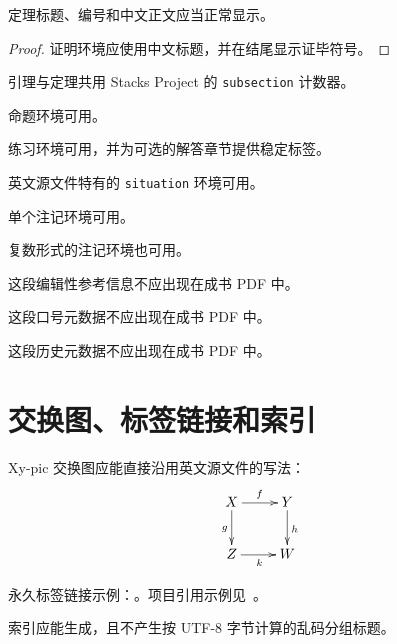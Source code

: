\begin{theorem}[示例定理]
\label{template-theorem-example}
定理标题、编号和中文正文应当正常显示。
\end{theorem}

\begin{proof}
证明环境应使用中文标题，并在结尾显示证毕符号。
\end{proof}

\begin{lemma}
\label{template-lemma-example}
引理与定理共用 Stacks Project 的 \texttt{subsection} 计数器。
\end{lemma}

\begin{proposition}
命题环境可用。
\end{proposition}

\begin{exercise}
\label{template-solution}
练习环境可用，并为可选的解答章节提供稳定标签。
\end{exercise}

\begin{situation}
\label{template-situation-example}
英文源文件特有的 \texttt{situation} 环境可用。
\end{situation}

\begin{remark}
单个注记环境可用。
\end{remark}

\begin{remarks}
复数形式的注记环境也可用。
\end{remarks}

\begin{reference}
这段编辑性参考信息不应出现在成书 PDF 中。
\end{reference}
\begin{slogan}
这段口号元数据不应出现在成书 PDF 中。
\end{slogan}
\begin{history}
这段历史元数据不应出现在成书 PDF 中。
\end{history}

\section{交换图、标签链接和索引}
\label{template-section-diagrams}

Xy-pic 交换图应能直接沿用英文源文件的写法：
\[
\xymatrix{
  X \ar[r]^f \ar[d]_g & Y \ar[d]^h \\
  Z \ar[r]_k & W
}
\]

永久标签链接示例：。项目引用示例见~\cite{stacks-project}。

索引应能生成，且不产生按 UTF-8 字节计算的乱码分组标题。
